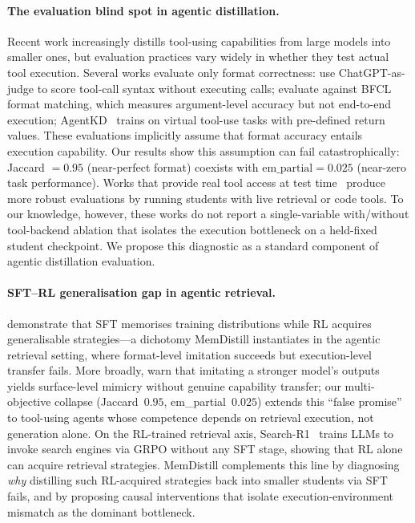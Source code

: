 \paragraph{The evaluation blind spot in agentic distillation.}
Recent work increasingly distills tool-using capabilities from large models into smaller ones, but evaluation practices vary widely in whether they test actual tool execution. Several works evaluate only format correctness: \citet{jhandi2025slm} use ChatGPT-as-judge to score tool-call syntax without executing calls; \citet{yin2025magnet} evaluate against BFCL format matching, which measures argument-level accuracy but not end-to-end execution; AgentKD~\cite{agentkd2025} trains on virtual tool-use tasks with pre-defined return values. These evaluations implicitly assume that format accuracy entails execution capability. Our results show this assumption can fail catastrophically: Jaccard $= 0.95$ (near-perfect format) coexists with $\text{em\_partial} = 0.025$ (near-zero task performance). Works that provide real tool access at test time~\cite{kang2025agent,liu2025structured} produce more robust evaluations by running students with live retrieval or code tools. To our knowledge, however, these works do not report a single-variable with/without tool-backend ablation that isolates the execution bottleneck on a held-fixed student checkpoint. We propose this diagnostic as a standard component of agentic distillation evaluation.

\paragraph{SFT--RL generalisation gap in agentic retrieval.}
\citet{chu2025sft} demonstrate that SFT memorises training distributions while RL acquires generalisable strategies---a dichotomy MemDistill instantiates in the agentic retrieval setting, where format-level imitation succeeds but execution-level transfer fails. More broadly, \citet{gudibande2023false} warn that imitating a stronger model's outputs yields surface-level mimicry without genuine capability transfer; our multi-objective collapse (Jaccard~$0.95$, em\_partial~$0.025$) extends this ``false promise'' to tool-using agents whose competence depends on retrieval execution, not generation alone. On the RL-trained retrieval axis, Search-R1~\cite{jin2025searchr1} trains LLMs to invoke search engines via GRPO without any SFT stage, showing that RL alone can acquire retrieval strategies. MemDistill complements this line by diagnosing \emph{why} distilling such RL-acquired strategies back into smaller students via SFT fails, and by proposing causal interventions that isolate execution-environment mismatch as the dominant bottleneck.

